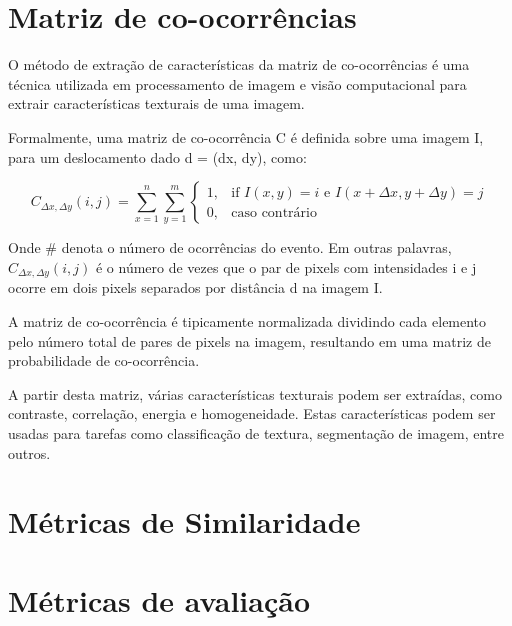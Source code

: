 \section{Matriz de co-ocorrências}\label{sec:teorica-matriz-co-ocorrencia}

O método de extração de características da matriz de co-ocorrências é
uma técnica utilizada em processamento de imagem e visão computacional
para extrair características texturais de uma imagem.

Formalmente, uma matriz de co-ocorrência C é definida sobre uma imagem
I, para um deslocamento dado d = (dx, dy), como:

\begin{equation}
C_{\Delta x, \Delta y}(i,j)=\sum_{x=1}^n\sum_{y=1}^m\begin{cases} 1, & \text{if }I(x,
                                                       y)=i\text{ e
                                                       }I(x+\Delta x, y+\Delta
                                                       y)=j \\ 0, &
                                                                    \text{caso contrário}\end{cases}
\end{equation}

Onde $\#$ denota o número de ocorrências do evento. Em outras palavras,
$C_{\Delta x, \Delta y}(i,j)$ é o número de vezes que o par de pixels com intensidades i
e j ocorre em dois pixels separados por distância d na imagem I.

A matriz de co-ocorrência é tipicamente normalizada dividindo cada
elemento pelo número total de pares de pixels na imagem, resultando em
uma matriz de probabilidade de co-ocorrência.

A partir desta matriz, várias características texturais podem ser
extraídas, como contraste, correlação, energia e homogeneidade. Estas
características podem ser usadas para tarefas como classificação de
textura, segmentação de imagem, entre outros.


\section{Métricas de Similaridade}\label{sec:teorica-metricas-de-similaridade}


\section{Métricas de avaliação}

